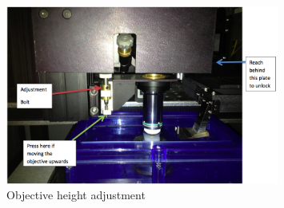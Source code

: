 \documentclass[paper=a4, fontsize=11pt]{scrartcl} %
\numberwithin{equation}{section} %
\numberwithin{figure}{section} %
\numberwithin{table}{section} %
\begin{document}
\begin{figure}[h]
\centering
\includegraphics[width=0.8\textwidth,natwidth=945,natheight=620]{objHeight.png}
\caption{Objective height adjustment}
\label{fig:objHeight}
\end{figure}
\end{document}
